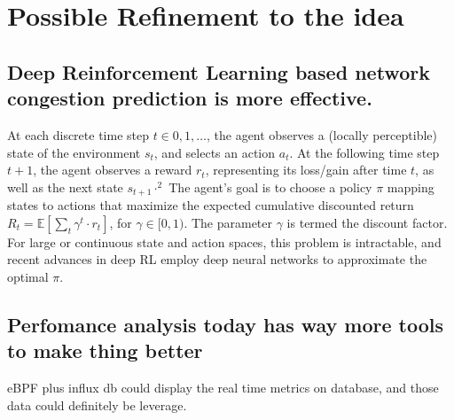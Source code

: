 \documentclass[acmlarge]{acmart}
\begin{document}
\section{Possible Refinement to the idea}
\subsection{Deep Reinforcement Learning based network congestion prediction is more effective.}
\cite{jay2019deep} At each discrete time step $t \in 0,1, \ldots$, the agent observes a (locally perceptible) state of the environment $s_{t}$, and selects an action $a_{t}$. At the following time step $t+1$, the agent observes a reward $r_{t}$, representing its loss/gain after time $t$, as well as the next state $s_{t+1} \cdot^{2}$ The agent's goal is to choose a policy $\pi$ mapping states to actions that maximize the expected cumulative discounted return $R_{t}=\mathbb{E}\left[\sum_{t} \gamma^{t} \cdot r_{t}\right]$, for $\gamma \in[0,1)$. The parameter $\gamma$ is termed the discount factor. For large or continuous state and action spaces, this problem is intractable, and recent advances in deep RL employ deep neural networks to approximate the optimal $\pi$.
\subsection{Perfomance analysis today has way more tools to make thing better}
eBPF plus influx db could display the real time metrics on database, and those data could definitely be leverage.



\end{document}
